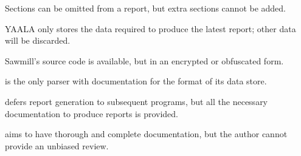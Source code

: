 \begin{table}[thbp]
    \begin{eqlist}

        \item [\dag{}] Sections can be omitted from a report, but extra
            sections cannot be added.

        \item [\ddag{}] YAALA only stores the data required to produce the
            latest report; other data will be discarded.

        \item [\nialpha{}] Sawmill's source code is available, but in an
            encrypted or obfuscated form.

        \item [\nibeta{}] \parsername{} is the only parser with
            documentation for the format of its data store.

        \item [\nichi{}] \parsername{} defers report generation to
            subsequent programs, but all the necessary documentation to
            produce reports is provided.

        \item [\niepsilon{}] \parsername{} aims to have thorough and
            complete documentation, but the author cannot provide an
            unbiased review.

    \end{eqlist}

\end{table}

\clearpage{}

